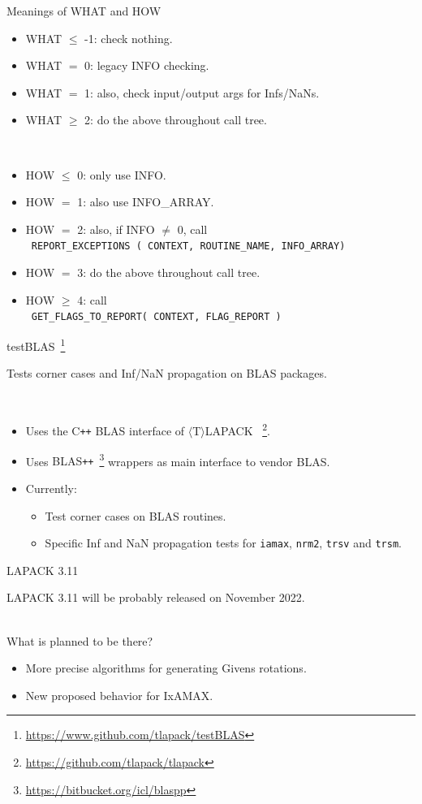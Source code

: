 \documentclass[11pt]{beamer}
\newcommand{\tlapack}{{$\langle$T$\rangle$LAPACK }}
\newcommand{\cpp}{{C\texttt{++}}}
\newcommand{\BLASPP}{{BLAS\texttt{++}}}
\begin{document}
\appendix



\begin{frame}{Meanings of WHAT and HOW}

	\begin{itemize}
		\item WHAT $\le$ -1: check nothing.
		\item WHAT $=$ 0: legacy INFO checking.
		\item WHAT $=$ 1: also, check input/output args for Infs/NaNs.
		\item WHAT $\ge$ 2: do the above throughout call tree.
	\end{itemize}

	~\\
	\begin{itemize}
		\item HOW $\le$ 0: only use INFO.
		\item HOW $=$ 1: also use INFO\_ARRAY.
		\item HOW $=$ 2: also, if INFO $\neq$ 0, call\\
			~\texttt{REPORT\_EXCEPTIONS ( CONTEXT, ROUTINE\_NAME, INFO\_ARRAY)}
		\item HOW $=$ 3: do the above throughout call tree.
		\item HOW $\ge$ 4: call\\
			~\texttt{GET\_FLAGS\_TO\_REPORT( CONTEXT, FLAG\_REPORT )}
	\end{itemize}

\end{frame}

\begin{frame}{testBLAS~\footnote{\url{https://www.github.com/tlapack/testBLAS}}}

	Tests corner cases and Inf/NaN propagation on BLAS packages.

	~\\
	\begin{itemize}
		\setlength\itemsep{1em}
		\item Uses the \cpp{} BLAS interface of \tlapack~\footnote{\url{https://github.com/tlapack/tlapack}}.
		\item Uses \BLASPP{}~\footnote{\url{https://bitbucket.org/icl/blaspp}} wrappers as main interface to vendor BLAS.
		\item Currently:
		\begin{itemize}
			\item Test corner cases on BLAS routines.
			\item Specific Inf and NaN propagation tests for \texttt{iamax}, \texttt{nrm2}, \texttt{trsv} and \texttt{trsm}.
		\end{itemize}
	\end{itemize}

\end{frame}

\begin{frame}{LAPACK 3.11}

	LAPACK 3.11 will be probably released on November 2022.

	~\\
	What is planned to be there?
	\begin{itemize}
		\item More precise algorithms for generating Givens rotations.
		\item New proposed behavior for IxAMAX.
	\end{itemize}
	
\end{frame}
\end{document}
